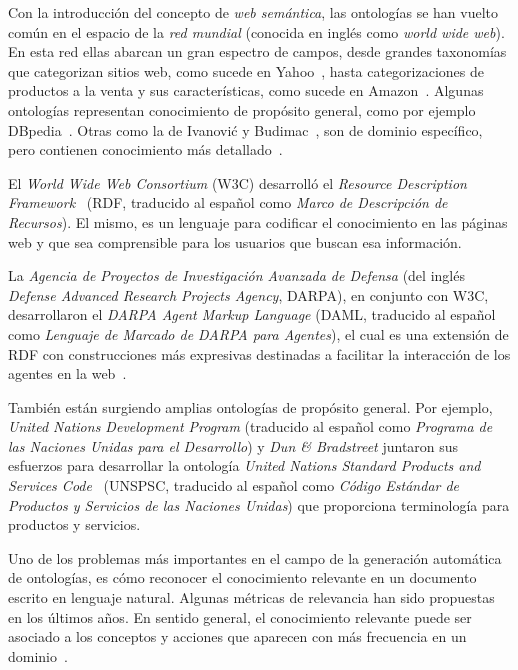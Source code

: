 \vspace{-0.2in}
Con la introducción del concepto de \textit{web semántica}, las ontologías se han vuelto común en el espacio de la \textit{red mundial} (conocida en inglés como \textit{world wide web}). En esta red ellas abarcan un gran espectro de campos, desde grandes taxonomías que categorizan sitios web, como sucede en Yahoo~\cite{ref:32}, hasta categorizaciones de productos a la venta y sus características, como sucede en Amazon~\cite{ref:33}. Algunas ontologías representan conocimiento de propósito general, como por ejemplo DBpedia~\cite{ref:81}. Otras como la de Ivanović y Budimac~\cite{ref:82}, son de dominio específico, pero contienen conocimiento más detallado~\cite{ref:83}.

El \textit{World Wide Web Consortium} (W3C) desarrolló el \textit{Resource Description Framework}~\cite{ref:5} (RDF, traducido al español como \textit{Marco de Descripción de Recursos}). El mismo, es un lenguaje para codificar el conocimiento en las páginas web y que sea comprensible para los usuarios que buscan esa información.

La \textit{Agencia de Proyectos de Investigación Avanzada de Defensa} (del inglés \textit{Defense Advanced Research Projects Agency}, DARPA), en conjunto con W3C, desarrollaron el \textit{DARPA Agent Markup Language} (DAML, traducido al español como \textit{Lenguaje de Marcado de DARPA para Agentes}), el cual es una extensión de RDF con construcciones más expresivas destinadas a facilitar la interacción de los agentes en la web~\cite{ref:6}.

También están surgiendo amplias ontologías de propósito general. Por ejemplo, \textit{United Nations Development Program} (traducido al español como \textit{Programa de las Naciones Unidas para el Desarrollo}) y \textit{Dun \& Bradstreet} juntaron sus esfuerzos para desarrollar la ontología \textit{United Nations Standard Products and Services Code}~\cite{ref:9} (UNSPSC, traducido al español como \textit{Código Estándar de Productos y Servicios de las Naciones Unidas}) que proporciona terminología para productos y servicios.

Uno de los problemas más importantes en el campo de la generación automática de ontologías, es cómo reconocer el conocimiento relevante en un documento escrito en lenguaje natural. Algunas métricas de relevancia han sido propuestas~\cite{ref:28,ref:84} en los últimos años. En sentido general, el conocimiento relevante puede ser asociado a los conceptos y acciones que aparecen con más frecuencia en un dominio~\cite{ref:83}.

